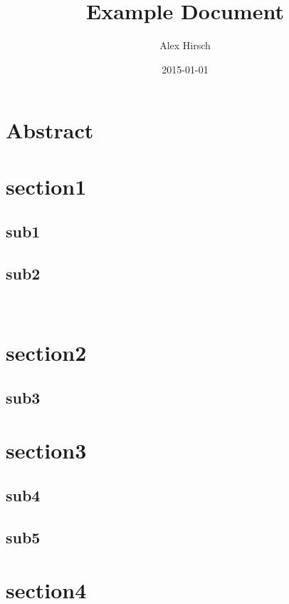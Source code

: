 \documentclass[book]{uibk}
\title{Example Document}
\author{Alex Hirsch}
\date{2015-01-01}
\begin{document}
\frontmatter

\maketitle

\chapter*{Abstract}
\label{ch:abstract}

\lipsum[1]

\tableofcontents

\mainmatter

\chapter{section1}
\label{ch:section1}

\lipsum[1]

\section{sub1}
\label{sec:sub1}

\lipsum[1-3]

\section{sub2}
\label{sec:sub2}

\lipsum[1-3]~\cite{wiki:denuvo}

\chapter{section2}
\label{ch:section2}

\lipsum[1]

\section{sub3}
\label{sec:sub3}

\lipsum[1-5]

\chapter{section3}
\label{ch:section3}

\lipsum[1]

\section{sub4}
\label{sec:sub4}

\lipsum[1-2]

\section{sub5}
\label{sec:sub5}

\lipsum[1-2]

\chapter{section4}
\label{ch:section4}

\lipsum[1-3]

\backmatter


\end{document}
